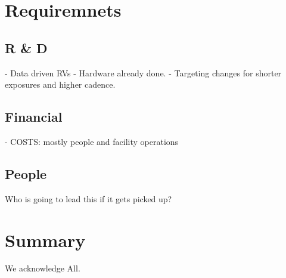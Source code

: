 \documentclass[11pt,preprint]{aastex}
\begin{document}
\section{Requiremnets}
\label{sec:results}
\subsection{R \& D}
- Data driven RVs
- Hardware already done. 
- Targeting changes for shorter exposures and higher cadence.

\subsection{Financial}
- COSTS: mostly people and facility operations

\subsection{People}
Who is going to lead this if it gets picked up?

\section{Summary}
\label{sec:summary}

\acknowledgements
We acknowledge All.

%
%
%
\end{document}
